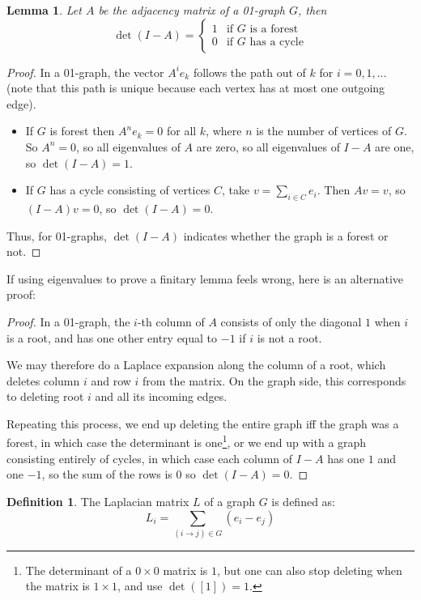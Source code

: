 \documentclass[a4paper, 11pt]{article}
\newtheorem{lemma}[theorem]{Lemma}
\theoremstyle{definition}
\newtheorem{definition}{Definition}[section]
\begin{document}
\begin{lemma}
  Let $A$ be the adjacency matrix of a 01-graph $G$, then
  \[
    \det(I-A) = \begin{cases}
      1 & \text{if $G$ is a forest}\\
      0 & \text{if $G$ has a cycle}
    \end{cases}
  \]
\end{lemma}
\begin{proof}
In a 01-graph, the vector $A^i e_k$ follows the path out of $k$ for $i=0,1,\dots$ (note that this path is unique because each vertex has at most one outgoing edge).

\begin{itemize}
  \item If $G$ is forest then $A^n e_k = 0$ for all $k$, where $n$ is the number of vertices of $G$. So $A^n = 0$, so all eigenvalues of $A$ are zero, so all eigenvalues of $I - A$ are one, so $\det(I - A) = 1$.
  \item If $G$ has a cycle consisting of vertices $C$, take $v = \sum_{i \in C} e_i$. Then $Av = v$, so $(I - A)v = 0$, so $\det(I - A) = 0$.
\end{itemize}
Thus, for 01-graphs, $\det(I - A)$ indicates whether the graph is a forest or not.
\end{proof}

If using eigenvalues to prove a finitary lemma feels wrong, here is an alternative proof:
\begin{proof}
In a 01-graph, the $i$-th column of $A$ consists of only the diagonal $1$ when $i$ is a root, and has one other entry equal to $-1$ if $i$ is not a root.

We may therefore do a Laplace expansion along the column of a root, which deletes column $i$ and row $i$ from the matrix. On the graph side, this corresponds to deleting root $i$ and all its incoming edges.

Repeating this process, we end up deleting the entire graph iff the graph was a forest, in which case the determinant is one\footnote{The determinant of a $0 \times 0$ matrix is $1$, but one can also stop deleting when the matrix is $1 \times 1$, and use $\det([1]) = 1$.}, or we end up with a graph consisting entirely of cycles, in which case each column of $I - A$ has one $1$ and one $-1$, so the sum of the rows is $0$ so $\det(I - A) = 0$.
\end{proof}

\begin{definition}
  The Laplacian matrix $L$ of a graph $G$ is defined as:
  \[ L_i = \sum_{(i \to j) \in G} (e_i - e_j) \]
\end{definition}
\end{document}
